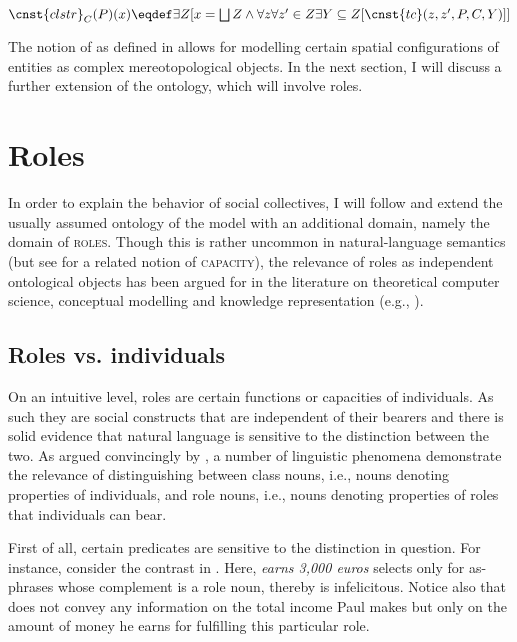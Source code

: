 \documentclass[output=paper]{langscibook}
\begin{document}
\ea $\cnst{clstr}_{C}(P)(x) \eqdef \exists Z[x = \bigsqcup Z \wedge \forall z \forall z' \in Z \exists Y \subseteq Z[\cnst{tc}(z,z',P,C,Y)]]$\label{wan:form:cluster}
\z

\noindent The notion of  as defined in  allows for modelling certain spatial configurations of entities as complex mereotopological objects. In the next section, I will discuss a further extension of the ontology, which will involve roles. 

\section{Roles}\label{wan:sec:roles}

In order to explain the behavior of social collectives, I will follow \citet{zobel2017sensitivity} and extend the usually assumed ontology of the model with an additional domain, namely the domain of \textsc{roles}. Though this is rather uncommon in natural-language semantics (but see \citealt{de-swart_winter_zwarts2007bare} for a related notion of \textsc{capacity}), the relevance of roles as independent ontological objects has been argued for in the literature on theoretical computer science, conceptual modelling and knowledge representation (e.g., \citealt{sowa1984conceptual,steimann2000representation,loebe2007abstract}).

\subsection{Roles vs. individuals}\label{wan:sec:roles-vs-individuals}

On an intuitive level, roles are certain functions or capacities of individuals. As such they are social constructs that are independent of their bearers and there is solid evidence that natural language is sensitive to the distinction between the two. As argued convincingly by \citet{zobel2017sensitivity}, a number of linguistic phenomena demonstrate the relevance of distinguishing between class nouns, i.e., nouns denoting properties of individuals, and role nouns, i.e., nouns denoting properties of roles that individuals can bear.

First of all, certain predicates are sensitive to the distinction in question. For instance, consider the contrast in  \citep[see also][]{szabo2003qualification}. Here, \textit{earns 3,000 euros} selects only for as-phrases whose complement is a role noun, thereby  is infelicitous. Notice also that  does not convey any information on the total income Paul makes but only on the amount of money he earns for fulfilling this particular role.
\end{document}
